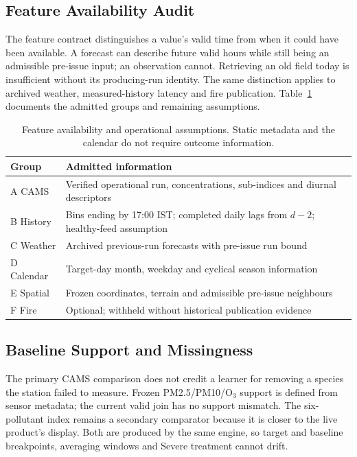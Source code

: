 \documentclass[journal]{IEEEtran}
\begin{document}
\subsection{Feature Availability Audit}
The feature contract distinguishes a value's valid time from when it could
have been available. A forecast can describe future valid hours while still
being an admissible pre-issue input; an observation cannot. Retrieving an old
field today is insufficient without its producing-run identity. The same
distinction applies to archived weather, measured-history latency and fire
publication. Table~\ref{tab:availability} documents the admitted groups and
remaining assumptions.
\begin{table}[t]\centering\footnotesize
\caption{Feature availability and operational assumptions. Static metadata and the calendar do not require outcome information.}
\label{tab:availability}
\setlength{\tabcolsep}{4pt}
\begin{tabular}{lp{}}
\toprule
Group & Admitted information\\\midrule
A CAMS & Verified operational run, concentrations, sub-indices and diurnal descriptors\\
B History & Bins ending by 17:00 IST; completed daily lags from $d-2$; healthy-feed assumption\\
C Weather & Archived previous-run forecasts with pre-issue run bound\\
D Calendar & Target-day month, weekday and cyclical season information\\
E Spatial & Frozen coordinates, terrain and admissible pre-issue neighbours\\
F Fire & Optional; withheld without historical publication evidence\\
\bottomrule\end{tabular}
\end{table}
\subsection{Baseline Support and Missingness}
The primary CAMS comparison does not credit a learner for removing a species
the station failed to measure. Frozen PM2.5/PM10/O$_3$ support is defined from
sensor metadata; the current valid join has no support mismatch. The
six-pollutant index remains a secondary comparator because it is closer to
the live product's display. Both are produced by the same engine, so target
and baseline breakpoints, averaging windows and Severe treatment cannot drift.
\end{document}
